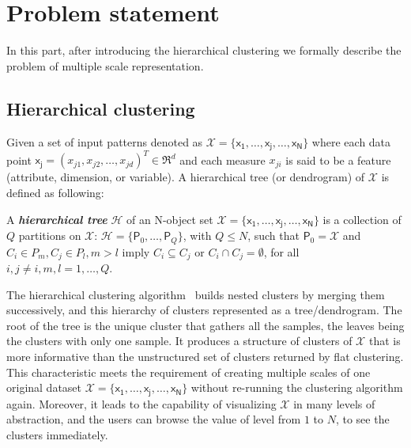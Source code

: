 \section{Problem statement}
\label{sec:problem}
In this part, after introducing the hierarchical clustering we formally describe the problem of 
multiple scale representation.

\vspace{-2.75mm}
\subsection{Hierarchical clustering}
\label{subsec:hierarchical}
Given a set of input patterns denoted as $\mathcal{X} = \{\mathsf{x_1}, \ldots, \mathsf{x_j}, \ldots, \mathsf{x_N}\}$ where each data point $\mathsf{x_j} = (x_{j1},x_{j2}, \ldots,x_{jd})^T \in \mathfrak{R}^d$ and each measure $x_{ji}$ is said to be a feature (attribute, dimension, or variable). A hierarchical tree (or dendrogram) of $\mathcal{X}$ is defined as following:
\begin{definition}
\label{def:hierarchical_tree}
A \textit{\textbf{hierarchical tree}} $\mathcal{H}$ of an N-object set $\mathcal{X}=\{\mathsf{x_1}, \ldots, \mathsf{x_j}, \ldots, \mathsf{x_N}\}$ is a collection of $Q$ partitions on $\mathcal{X}$: $\mathcal{H}=\{\mathsf{P}_0,\ldots,\mathsf{P}_Q\}$, with $Q \leq N$, such that $\mathsf{P}_0=\mathcal{X}$ and $C_{i} \in P_{m}, C_{j} \in P_{l}, m > l$ imply $C_{i} \subseteq C_{j}$ or $C_{i} \cap C_{j} = \emptyset$, for all $i,j \neq i, m, l = 1, \ldots, Q$.
\end{definition}
The hierarchical clustering algorithm~\cite{johnson1967hierarchical} builds nested clusters by merging them successively, and this hierarchy of clusters represented as a tree/dendrogram. The root of the tree is the unique cluster that gathers all the samples, the leaves being the clusters with only one sample. It produces a structure of clusters of $\mathcal{X}$ that is more informative than the unstructured set of clusters returned by flat clustering. This characteristic meets the requirement of creating multiple scales of one original dataset $\mathcal{X}=\{\mathsf{x_1}, \ldots, \mathsf{x_j}, \ldots, \mathsf{x_N}\}$ 
without re-running the clustering algorithm again.
Moreover, it leads to the capability of visualizing $\mathcal{X}$ in many levels of abstraction, and the users can browse the value of level from $1$ to $N$, to see the clusters immediately.

